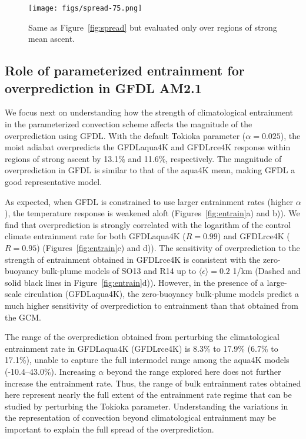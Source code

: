 \documentclass[draft]{agujournal2019}
\begin{document}
\begin{figure}
\centering
\texttt{[image: figs/spread-75.png]}
\caption{Same as Figure~\ref{fig:spread} but evaluated only over regions of strong mean ascent.}
\label{fig:spread-75}
\end{figure}

\subsection{Role of parameterized entrainment for overprediction in GFDL AM2.1}
We focus next on understanding how the strength of climatological entrainment in the parameterized convection scheme affects the magnitude of the overprediction using GFDL. With the default Tokioka parameter ($\alpha=0.025$), the moist adiabat overpredicts the GFDLaqua4K and GFDLrce4K response within regions of strong ascent by 13.1\% and 11.6\%, respectively. The magnitude of overprediction in GFDL is similar to that of the aqua4K mean, making GFDL a good representative model.

As expected, when GFDL is constrained to use larger entrainment rates (higher $\alpha$), the temperature response is weakened aloft (Figures~\ref{fig:entrain}a) and b)). We find that overprediction is strongly correlated with the logarithm of the control climate entrainment rate for both GFDLaqua4K ($R=0.99$) and GFDLrce4K ($R=0.95$) (Figures~\ref{fig:entrain}c) and d)). The sensitivity of overprediction to the strength of entrainment obtained in GFDLrce4K is consistent with the zero-buoyancy bulk-plume models of SO13 and R14 up to $\langle \epsilon \rangle = 0.2$ 1/km (Dashed and solid black lines in Figure~\ref{fig:entrain}d)). However, in the presence of a large-scale circulation (GFDLaqua4K), the zero-buoyancy bulk-plume models predict a much higher sensitivity of overprediction to entrainment than that obtained from the GCM.

The range of the overprediction obtained from perturbing the climatological entrainment rate in GFDLaqua4K (GFDLrce4K) is 8.3\% to 17.9\% (6.7\% to 17.1\%), unable to capture the full intermodel range among the aqua4K models (-10.4--43.0\%). Increasing $\alpha$ beyond the range explored here does not further increase the entrainment rate. Thus, the range of bulk entrainment rates obtained here represent nearly the full extent of the entrainment rate regime that can be studied by perturbing the Tokioka parameter.  Understanding the variations in the representation of convection beyond climatological entrainment may be important to explain the full spread of the overprediction.
\end{document}
